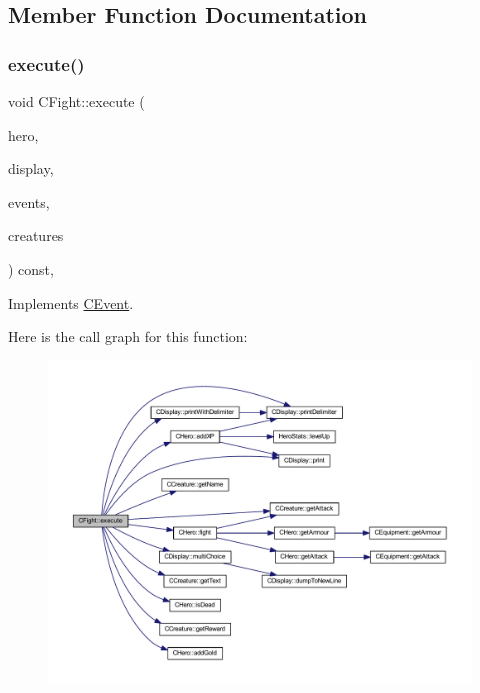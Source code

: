 \subsection{Member Function Documentation}
\mbox{\label{class_c_fight_ac820b62e70990ddc90ecb959f4497f8f}} 
\subsubsection{\texorpdfstring{execute()}{execute()}}
{\footnotesize\ttfamily void C\+Fight\+::execute (\begin{DoxyParamCaption}\item[{\mbox{\hyperlink{class_c_hero}{C\+Hero}} \&}]{hero,  }\item[{const \mbox{\hyperlink{class_c_display}{C\+Display}} \&}]{display,  }\item[{const std\+::map$<$ int, const \mbox{\hyperlink{class_c_event}{C\+Event}} $\ast$$>$ \&}]{events,  }\item[{const std\+::map$<$ int, const \mbox{\hyperlink{class_c_creature}{C\+Creature}} $\ast$$>$ \&}]{creatures }\end{DoxyParamCaption}) const\hspace{0.3cm}{\ttfamily [override]}, {\ttfamily [virtual]}}



Implements \mbox{\hyperlink{class_c_event_a46bd2925f7f19c5c0d6adf2b1e6e3f70}{C\+Event}}.

Here is the call graph for this function\+:\nopagebreak
\begin{figure}[H]
\begin{center}
\leavevmode
\includegraphics[width=350pt]{class_c_fight_ac820b62e70990ddc90ecb959f4497f8f_cgraph}
\end{center}
\end{figure}
\mbox{\label{class_c_fight_a70c350b815744b481134b4d3ac0f61bb}} 
